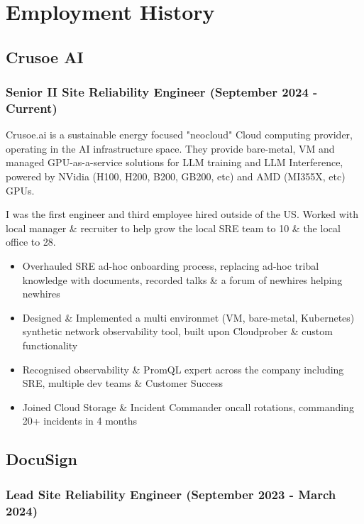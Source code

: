 \documentclass[a4paper, 10pt] {article}
\begin{document}
\newpage

\section*{Employment History}

\subsection*{Crusoe AI}

\subsubsection*{Senior II Site Reliability Engineer (September 2024 - Current)}

Crusoe.ai is a sustainable energy focused "neocloud" Cloud computing provider, operating in the AI infrastructure space. They provide bare-metal,
VM and managed GPU-as-a-service solutions for LLM training and LLM Interference, powered by NVidia (H100, H200, B200, GB200, etc)
and AMD (MI355X, etc) GPUs.

I was the first engineer and third employee hired outside of the US. Worked with local manager \& recruiter to help grow the local SRE team to 10
\& the local office to 28.

\begin{itemize}[noitemsep]
	\item Overhauled SRE ad-hoc onboarding process, replacing ad-hoc tribal knowledge with documents, recorded talks \& a forum of newhires helping newhires
 	\item Designed \& Implemented a multi environmet (VM, bare-metal, Kubernetes) synthetic network observability tool, built upon Cloudprober \& custom functionality
    \item Recognised observability \& PromQL expert across the company including SRE, multiple dev teams \& Customer Success
 	\item Joined Cloud Storage \& Incident Commander oncall rotations, commanding 20+ incidents in 4 months
\end{itemize}

\subsection*{DocuSign}

\subsubsection*{Lead Site Reliability Engineer (September 2023 - March 2024)}
\end{document}
